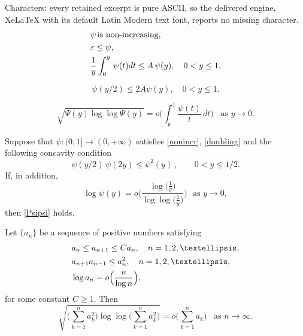 \documentclass[10pt,a4paper]{amsart}
\begin{document}
Characters: every retained excerpt is pure ASCII, so the delivered engine, XeLaTeX with its default Latin Modern text font, reports no missing character.
\begin{eqnarray}
& \psi \, \text{is non-increasing, }   \label{nonincr} \vspace{0.12cm}\\
& \varepsilon \leq \psi , \label{epsipsi}\vspace{0.12cm}\\
& \displaystyle \frac{1}{y}\int_{0}^y \, \psi (t) dt  \leq   A \, \psi (y), \quad 0<y\leq 1 ,  \label{psi} \vspace{0.12cm}
\end{eqnarray}

\begin{equation}\label{doubling}
\psi (y/2)  \leq 2A \psi (y), \quad 0<y \leq 1 .
\end{equation}

\begin{equation}\label{Psipsi}
\sqrt{\Psi (y) \log \log \Psi (y)} = o \Big ( \int_y^1 \frac{\psi (t)}{t} \, dt \Big ) \, \, \, \, \, \text{as} \, \,  y \to 0 . 
\end{equation}

\begin{theorem}\label{thmthreshold}
Suppose that $\psi :(0,1] \to (0,+\infty )$ satisfies \eqref{nonincr}, \eqref{doubling} and the following concavity condition
\begin{equation}\label{concav}
\psi (y/2) \, \psi(2y) \leq \psi^2 (y) \, , \qquad  0 < y \leq 1/2 . 
\end{equation}
If, in addition,
\begin{equation}\label{threshold}
\log \psi (y) = o \Big ( \frac{\log \big ( \frac{1}{y} \big)}{ \log \log \big ( \frac{1}{y} \big)}   \Big )  \, \, \, \, \text{as} \, \, y \to 0 , 
\end{equation}
then \eqref{Psipsi} holds.
\end{theorem}

\begin{lem}\label{discrete}
Let $\{ a_n \}$ be a sequence of positive numbers satisfying
\begin{eqnarray}
& a_n \leq a_{n+1} \leq C a_n ,\quad  n=1,2,\ldots , \vspace{0.2cm} \label{crecdoub}\\
& a_{n+1}a_{n-1} \leq a^2_n , \quad n=1,2,\ldots , \vspace{0.2cm} \label{discconcav}\\
& \log a_n = \displaystyle o\Big ( \frac{n}{\log n}  \Big ) ,  \label{discthreshold}
\end{eqnarray}
for some constant $C \geq 1$. Then
\begin{equation}\label{discimprov}
\sqrt{\big ( \sum_{k=1}^n a_k^2 \big )\log \log \big ( \sum_{k=1}^n a_k^2 \big )} = o \Big ( \sum_{k=1}^n a_k \Big ) \, \, \, \, \, \text{as} \, \, n\to \infty . 
\end{equation}
\end{lem}
\end{document}
